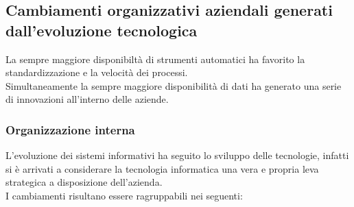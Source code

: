 \documentclass{book}
\begin{document}
    \subsection{Cambiamenti organizzativi aziendali generati dall'evoluzione tecnologica}
    La sempre maggiore disponibiltà di strumenti automatici ha favorito la standardizzazione e la velocità dei processi.\\
    Simultaneamente la sempre maggiore disponibilità di dati ha generato una serie di innovazioni all'interno delle aziende.\\
    \subsubsection{Organizzazione interna}
    L'evoluzione dei sistemi informativi ha seguito lo sviluppo delle tecnologie, infatti si è arrivati a considerare la tecnologia informatica una vera e propria leva strategica a disposizione dell'azienda.\\
    I cambiamenti risultano essere ragruppabili nei seguenti:
\end{document}
